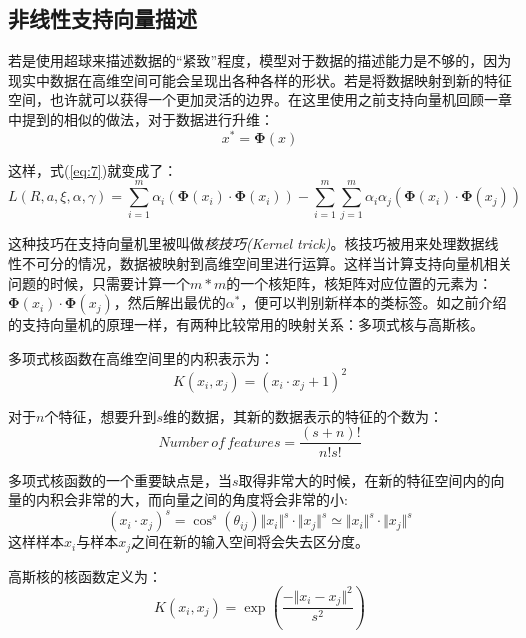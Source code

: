 \documentclass[UTF8, 12pt]{ctexart}
\begin{document}
\subsection{非线性支持向量描述}
若是使用超球来描述数据的“紧致”程度，模型对于数据的描述能力是不够的，因为现实中数据在高维空间可能会呈现出各种各样的形状。若是将数据映射到新的特征空间，也许就可以获得一个更加灵活的边界。在这里使用之前支持向量机回顾一章中提到的相似的做法，对于数据进行升维：
\begin{equation}
	x^{*} = \boldsymbol{\Phi}(x)
\end{equation}

这样，式(\ref{eq:7})就变成了：
\begin{equation}
	L(R,a,\xi,\alpha,\gamma) = \sum_{i=1}^{m}\alpha_{i}(\boldsymbol{\Phi}(x_{i})·\boldsymbol{\Phi}(x_{i})) - \sum_{i=1}^{m}\sum_{j=1}^{m}\alpha_{i}\alpha_{j}(\boldsymbol{\Phi}(x_{i})·\boldsymbol{\Phi}(x_{j}))
\end{equation}

这种技巧在支持向量机里被叫做\emph{核技巧(Kernel trick)}。核技巧被用来处理数据线性不可分的情况，数据被映射到高维空间里进行运算。这样当计算支持向量机相关问题的时候，只需要计算一个$m*m$的一个核矩阵，核矩阵对应位置的元素为：$\boldsymbol{\Phi}(x_{i})·\boldsymbol{\Phi}(x_{j})$，然后解出最优的$\alpha^{*}$，便可以判别新样本的类标签。如之前介绍的支持向量机的原理一样，有两种比较常用的映射关系：多项式核与高斯核。

多项式核函数在高维空间里的内积表示为：
\begin{equation}
	K(x_{i}, x_{j}) = (x_{i}·x_{j}+1)^{2}
\end{equation}

对于$n$个特征，想要升到$s$维的数据，其新的数据表示的特征的个数为：
\begin{equation}
	Number \, of \, features = \frac{(s+n)!}{n!s!}
\end{equation}

多项式核函数的一个重要缺点是，当$s$取得非常大的时候，在新的特征空间内的向量的内积会非常的大，而向量之间的角度将会非常的小:
\begin{equation}
	(x_{i}·x_{j})^{s} = \cos^{s}(\theta_{ij}){\Vert x_{i} \Vert}^{s}·{\Vert x_{j} \Vert}^{s} \simeq {\Vert x_{i} \Vert}^{s}·{\Vert x_{j} \Vert}^{s}
\end{equation}
这样样本$x_{i}$与样本$x_{j}$之间在新的输入空间将会失去区分度。

高斯核的核函数定义为：
\begin{equation}
	K(x_{i}, x_{j}) = \exp(\frac{-{\Vert x_{i} - x_{j} \Vert}^{2}}{s^2})
\end{equation}
\end{document}
